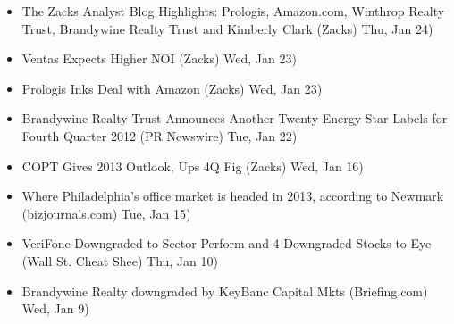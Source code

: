 \documentclass[11pt,asymmetric]{article}
\begin{document}
\begin{itemize}
\item The Zacks Analyst Blog Highlights: Prologis, Amazon.com, Winthrop Realty Trust, Brandywine Realty Trust and Kimberly Clark (Zacks) Thu, Jan 24)
\item Ventas Expects Higher NOI (Zacks) Wed, Jan 23)
\item Prologis Inks Deal with Amazon (Zacks) Wed, Jan 23)
\item Brandywine Realty Trust Announces Another Twenty Energy Star Labels for Fourth Quarter 2012 (PR Newswire) Tue, Jan 22)
\item COPT Gives 2013 Outlook, Ups 4Q Fig (Zacks) Wed, Jan 16)
\item Where Philadelphia’s office market is headed in 2013, according to Newmark (bizjournals.com) Tue, Jan 15)
\item VeriFone Downgraded to Sector Perform and 4 Downgraded Stocks to Eye (Wall St. Cheat Shee) Thu, Jan 10)
\item Brandywine Realty downgraded by KeyBanc Capital Mkts (Briefing.com) Wed, Jan 9)
\end{itemize}
\end{document}
